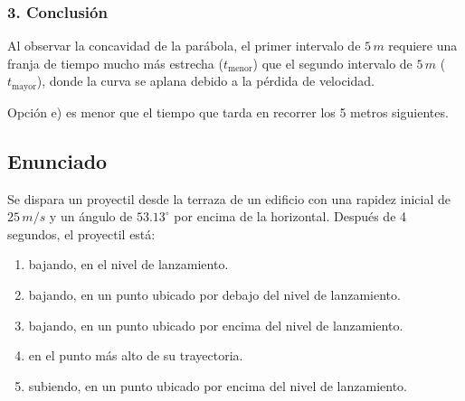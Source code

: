 \documentclass[12pt, a4paper]{article}
\begin{document}
\subsubsection*{3. Conclusión}
Al observar la concavidad de la parábola, el primer intervalo de $5 \, \si{m}$ requiere una franja de tiempo mucho más estrecha ($t_{\text{menor}}$) que el segundo intervalo de $5 \, \si{m}$ ($t_{\text{mayor}}$), donde la curva se aplana debido a la pérdida de velocidad.

\begin{tcolorbox}[colback=green!5!white, colframe=green!50!black, title=Respuesta Final]
\centering Opción e) es menor que el tiempo que tarda en recorrer los 5 metros siguientes.
\end{tcolorbox}

\newpage

\subsection*{Enunciado}
Se dispara un proyectil desde la terraza de un edificio con una rapidez inicial de $25 \, \si{m/s}$ y un ángulo de $53.13^\circ$ por encima de la horizontal. Después de 4 segundos, el proyectil está:
\begin{enumerate}[label=\alph*)]
    \item bajando, en el nivel de lanzamiento.
    \item bajando, en un punto ubicado por debajo del nivel de lanzamiento.
    \item bajando, en un punto ubicado por encima del nivel de lanzamiento.
    \item en el punto más alto de su trayectoria.
    \item subiendo, en un punto ubicado por encima del nivel de lanzamiento.
\end{enumerate}

\begin{center}
\end{center}
\end{document}
